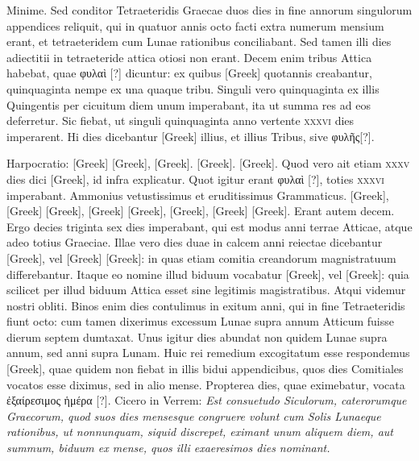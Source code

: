 Minime.
Sed conditor
Tetraeteridis Graecae duos dies in fine annorum singulorum appendices
reliquit, qui in quatuor annis octo facti extra numerum mensium
erant, et tetraeteridem cum Lunae rationibus conciliabant.
Sed tamen
illi dies adiectitii in tetraeteride attica otiosi non erant.
Decem enim
tribus Attica habebat, quae \textgreek{φυλαὶ [?]} dicuntur: ex quibus
 \textgreek{[Greek]}
quotannis creabantur, quinquaginta nempe ex una quaque tribu.
Singuli
vero quinquaginta ex illis Quingentis per cicuitum diem unum
imperabant, ita ut summa res ad eos deferretur.
Sic fiebat, ut singuli
quinquaginta anno vertente \textsc{xxxvi} dies imperarent.
Hi dies dicebantur
\textgreek{[Greek]} illius, et illius Tribus, sive \textgreek{φυλῆς[?]}.

Harpocratio: \textgreek{[Greek]}
\textgreek{[Greek]}, \textgreek{[Greek]}.
\textgreek{[Greek]}.
\textgreek{[Greek]}.
Quod vero
ait etiam \textsc{xxxv} dies dici \textgreek{[Greek]}, id infra explicatur.
Quot igitur
erant \textgreek{φυλαὶ [?]}, toties \textsc{xxxvi} imperabant.
Ammonius vetustissimus et eruditissimus
Grammaticus.
\textgreek{[Greek]}, \textgreek{[Greek]}
\textgreek{[Greek]}, \textgreek{[Greek]}
\textgreek{[Greek]}, \textgreek{[Greek]}, \textgreek{[Greek]}
\textgreek{[Greek]}.
Erant autem decem.
Ergo decies triginta sex dies imperabant,
qui est modus anni terrae Atticae, atque adeo totius Graeciae.
Illae
vero dies duae in calcem anni reiectae dicebantur \textgreek{[Greek]},
 vel \textgreek{[Greek]}
\textgreek{[Greek]}: in quas etiam comitia creandorum magnistratuum
 differebantur.
Itaque eo nomine illud biduum vocabatur \textgreek{[Greek]}, vel
\textgreek{[Greek]}: quia scilicet per illud biduum
 Attica esset sine legitimis
magistratibus.
Atqui videmur nostri obliti.
Binos enim dies contulimus
in exitum anni, qui in fine Tetraeteridis fiunt octo: cum tamen
dixerimus excessum Lunae supra annum Atticum fuisse dierum septem
dumtaxat.
Unus igitur dies abundat non quidem Lunae supra annum,
sed anni supra Lunam.
Huic rei remedium excogitatum esse respondemus
\textgreek{[Greek]}, quae quidem non fiebat in illis bidui appendicibus,
quos dies Comitiales vocatos esse diximus, sed in alio mense.
Propterea
dies, quae eximebatur, vocata \textgreek{ἐξαίρεσιμος ἡμέρα [?]}.
Cicero in Verrem: \emph{Est
consuetudo Siculorum, caterorumque Graecorum, quod suos dies mensesque
congruere volunt cum Solis Lunaeque rationibus, ut nonnunquam, siquid
discrepet, eximant unum aliquem diem, aut summum, biduum ex
mense, quos illi exaeresimos dies nominant.}

